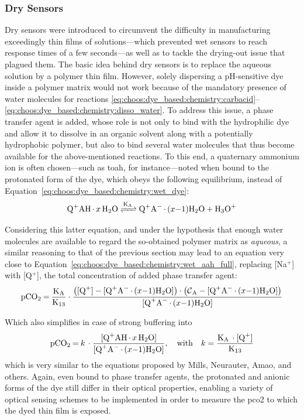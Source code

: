 \subsubsection{Dry Sensors}

Dry sensors were introduced to circumvent the difficulty in manufacturing exceedingly thin films of solutions---which prevented wet sensors to reach response times of a few seconds---as well as to tackle the drying-out issue that plagued them\cite{wolfbeis2005, mills2009}. The basic idea behind dry sensors is to replace the aqueous solution by a polymer thin film. However, solely dispersing a pH-sensitive dye inside a polymer matrix would not work because of the mandatory presence of water molecules for reactions \ref{eq:choos:dye_based:chemistry:carbacid}--\ref{eq:choos:dye_based:chemistry:disso_water}. To address this issue, a phase transfer agent is added, whose role is not only to bind with the hydrophilic dye and allow it to dissolve in an organic solvent along with a potentially hydrophobic polymer, but also to bind several water molecules that thus become available for the above-mentioned reactions\cite{mills2009}. To this end, a quaternary ammonium ion is often chosen---such as \gls{toah}, for instance\cite{amao2004}---noted  when bound to the protonated form of the dye, which obeys the following equilibrium, instead of Equation~\ref{eq:choos:dye_based:chemistry:wet_dye}:
\begin{equation}
	\ce{Q^+AH.$x$H_2O <=>[K_A] Q^+A^-.$(x-1)$H_2O + H_3O^+}
\end{equation}

Considering this latter equation, and under the hypothesis that enough water molecules are available to regard the so-obtained polymer matrix as \emph{aqueous}, a similar reasoning to that of the previous section may lead to an equation very close to Equation~\ref{eq:choos:dye_based:chemistry:wet_aah_full}, replacing [Na$^+$] with [Q$^+$], the total concentration of added phase transfer agent:
\begin{equation}\label{eq:choos:dye_based:chemistry:dry_aah_unbuff}
	\ce{pCO_2 = \frac{K_A}{K_{13}}}\cdot \frac{\left(\ce{[Q^+] - [Q^+A^-.$(x-1)$H_2O]}\right)\cdot\left(\ce{\mathcal{C}_A - [Q^+A^-.$(x-1)$H_2O]}\right)}{\ce{[Q^+A^-.$(x-1)$H_2O]}}
\end{equation}

Which also simplifies in case of strong buffering into
\begin{equation}\label{eq:choos:dye_based:chemistry:dry_aah_buff}
	\ce{pCO_2 = $k$ \cdot \frac{[Q^+AH.$x$H_2O]}{[Q^+A^-.$(x-1)$H_2O]}} , \quad \text{with} \quad k = \ce{\frac{K_A \cdot [Q^+]}{K_{13}}}
\end{equation}
which is very similar to the equations proposed by Mills, Neurauter, Amao, and others\cite{mills1992, neurauter1999, amao2005b}. Again, even bound to phase transfer agents, the protonated and anionic forms of the dye still differ in their optical properties, enabling a variety of optical sensing schemes to be implemented in order to measure the \gls{pco2} to which the dyed thin film is exposed.

